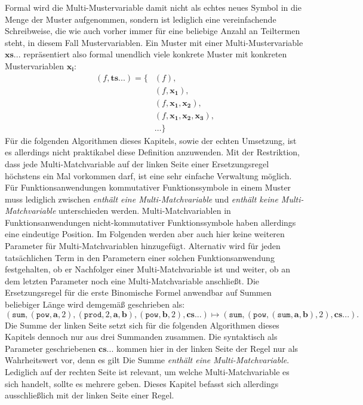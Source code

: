 Formal wird die Multi-Mustervariable damit nicht als echtes neues Symbol in die Menge der Muster aufgenommen, sondern ist lediglich eine vereinfachende Schreibweise, die wie auch vorher immer für eine beliebige Anzahl an Teiltermen steht, in diesem Fall Mustervariablen. Ein Muster mit einer Multi-Mustervariable $\mathbf{xs...}$ repräsentiert also formal unendlich viele konkrete Muster mit konkreten Mustervariablen $\mathbf{x_i}$:
\begin{equation*}
	\begin{split}
			(f, \mathbf{ts...}) = \{&(f), \\
			&(f, \mathbf{x_1}),\\
			&(f, \mathbf{x_1}, \mathbf{x_2}), \\
			&(f, \mathbf{x_1}, \mathbf{x_2}, \mathbf{x_3}), \\
			&\dots \}    		
	\end{split}
\end{equation*}
Für die folgenden Algorithmen dieses Kapitels, sowie der echten Umsetzung, ist es allerdings nicht praktikabel diese Definition anzuwenden. Mit der Restriktion, dass jede Multi-Matchvariable auf der linken Seite einer Ersetzungsregel höchstens ein Mal vorkommen darf, ist eine sehr einfache Verwaltung möglich. Für Funktionsanwendungen kommutativer Funktionssymbole in einem Muster muss lediglich zwischen \emph{enthält eine Multi-Matchvariable} und \emph{enthält keine Multi-Matchvariable} unterschieden werden. Multi-Matchvariablen in Funktionsanwendungen nicht-kommutativer Funktionssymbole haben allerdings eine eindeutige Position. Im Folgenden werden aber auch hier keine weiteren Parameter für Multi-Matchvariablen hinzugefügt. Alternativ wird für jeden tatsächlichen Term in den Parametern einer solchen Funktionsanwendung festgehalten, ob er Nachfolger einer Multi-Matchvariable ist und weiter, ob an dem letzten Parameter noch eine Multi-Matchvariable anschließt. 
Die Ersetzungsregel für die erste Binomische Formel anwendbar auf Summen beliebiger Länge wird demgemäß  geschrieben als:
$$(\texttt{sum}, (\texttt{pow}, \mathbf a, 2), (\texttt{prod}, 2, \mathbf a, \mathbf b), (\texttt{pow}, \mathbf b, 2), \mathbf{cs...}) \mapsto (\texttt{sum}, (\texttt{pow}, (\texttt{sum}, \mathbf a, \mathbf b), 2), \mathbf{cs...}).$$
Die Summe der linken Seite setzt sich für die folgenden Algorithmen dieses Kapitels dennoch nur aus drei Summanden zusammen. Die syntaktisch als Parameter geschriebenen $\mathbf{cs...}$ kommen hier in der linken Seite der Regel nur als Wahrheitswert vor, denn es gilt \glqq Die Summe \emph{enthält eine Multi-Matchvariable}\grqq{}. Lediglich auf der rechten Seite ist relevant, um welche Multi-Matchvariable es sich handelt, sollte es mehrere geben. Dieses Kapitel befasst sich allerdings ausschließlich mit der linken Seite einer Regel.




